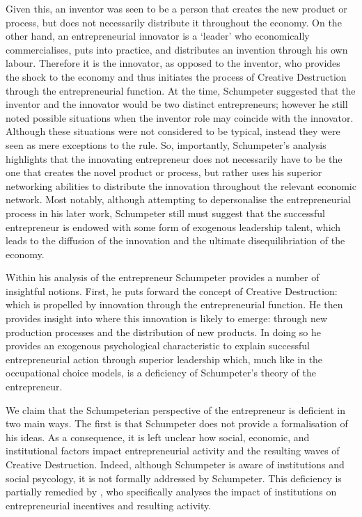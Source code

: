 Given this, an inventor was seen to be a person that creates the new product or process, but does not necessarily distribute it throughout the economy. On the other hand, an entrepreneurial innovator is a `leader' who economically commercialises, puts into practice, and distributes an invention through his own labour. Therefore it is the innovator, as opposed to the inventor, who provides the shock to the economy and thus initiates the process of Creative Destruction through the entrepreneurial function. At the time, Schumpeter suggested that the inventor and the innovator would be two distinct entrepreneurs; however he still noted possible situations when the inventor role may coincide with the innovator. Although these situations were not considered to be typical, instead they were seen as mere exceptions to the rule. So, importantly, Schumpeter's analysis highlights that the innovating entrepreneur does not necessarily have to be the one that creates the novel product or process, but rather uses his superior networking abilities to distribute the innovation throughout the relevant economic network. Most notably, although attempting to depersonalise the entrepreneurial process in his later work, Schumpeter still must suggest that the successful entrepreneur is endowed with some form of exogenous leadership talent, which leads to the diffusion of the innovation and the ultimate disequilibriation of the economy.

Within his analysis of the entrepreneur Schumpeter provides a number of insightful notions. First, he puts forward the concept of Creative Destruction: which is propelled by innovation through the entrepreneurial function. He then provides insight into where this innovation is likely to emerge: through new production processes and the distribution of new products. In doing so he provides an exogenous psychological characteristic to explain successful entrepreneurial action through superior leadership which, much like in the occupational choice models, is a deficiency of Schumpeter's theory of the entrepreneur. 

We claim that the Schumpeterian perspective of the entrepreneur is deficient in two main ways. The first is that Schumpeter does not provide a formalisation of his ideas. As a consequence, it is left unclear how social, economic, and institutional factors impact entrepreneurial activity and the resulting waves of Creative Destruction. Indeed, although Schumpeter is aware of institutions and social psycology, it is not formally addressed by Schumpeter. This deficiency is partially remedied by \citet{Baumol1990}, who specifically analyses the impact of institutions on entrepreneurial incentives and resulting activity.

